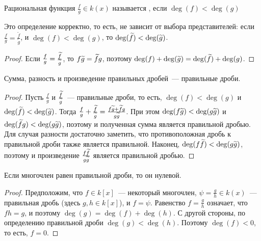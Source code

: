 \begin{definition}
Рациональная функция $\frac{f}{g}\in k(x)$ называется
, если $\deg(f)<\deg(g)$
\end{definition}

\begin{lemma}
Это определение корректно, то есть, не зависит от выбора
представителей: если
$\frac{f}{g}=\frac{\widetilde{f}}{\widetilde{g}}$, и
$\deg(f)<\deg(g)$, то $\deg(\widetilde{f})<\deg(\widetilde{g})$.
\end{lemma}
\begin{proof}
Если $\frac{f}{g}=\frac{\widetilde{f}}{\widetilde{g}}$, то $f\widetilde{g}=\widetilde{f}g$,
поэтому $\deg(f)+\deg(\widetilde{g})=\deg(\widetilde{f})+\deg(g)$.
\end{proof}

\begin{lemma}\label{lem_sum_of_proper}
Сумма, разность и произведение правильных дробей~--- правильные дроби.
\end{lemma}
\begin{proof}
Пусть $\frac{f}{g}$ и $\frac{\widetilde{f}}{\widetilde{g}}$~--- правильные
дроби, то есть, $\deg(f)<\deg(g)$ и $\deg(\widetilde{f})<\deg(\widetilde{g})$. Тогда
$\frac{f}{g}+\frac{\widetilde{f}}{\widetilde{g}}=\frac{f\widetilde{g}+\widetilde{f}g}{g\widetilde{g}}$.
При этом $\deg(f\widetilde{g})<\deg(g\widetilde{g})$ и
$\deg(\widetilde{f}g)<\deg(g\widetilde{g})$, поэтому и полученная сумма является
правильной дробью. Для случая разности достаточно заметить, что
противоположная дробь к правильной дроби также является
правильной. Наконец, $\deg(f\widetilde{f})<\deg(g\widetilde{g})$, поэтому и
произведение $\frac{f\widetilde{f}}{g\widetilde{g}}$ является правильной дробью.
\end{proof}

\begin{lemma}\label{lem:proper_fraction_is_not_poly}
Если многочлен равен правильной дроби, то он нулевой.
\end{lemma}
\begin{proof}
Предположим, что $f\in k[x]$~--- некоторый многочлен,
$\psi = \frac{g}{h} \in k(x)$~--- правильная дробь (здесь $g,h\in
k[x]$),
и $f=\psi$. Равенство $f = \frac{g}{h}$ означает, что
$fh = g$, и поэтому $\deg(g) = \deg(f) + \deg(h)$. С другой стороны,
по определению правильной дроби $\deg(g) < \deg(h)$.
Поэтому $\deg(f) < 0$, то есть, $f=0$.
\end{proof}

